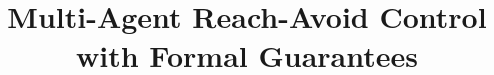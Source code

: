 \documentclass[sigconf,review]{acmart}
\title{Multi-Agent Reach-Avoid Control with Formal Guarantees}
\begin{document}
\begin{abstract}
	
\end{abstract}

\maketitle




	


%






%
% 
\end{document}
